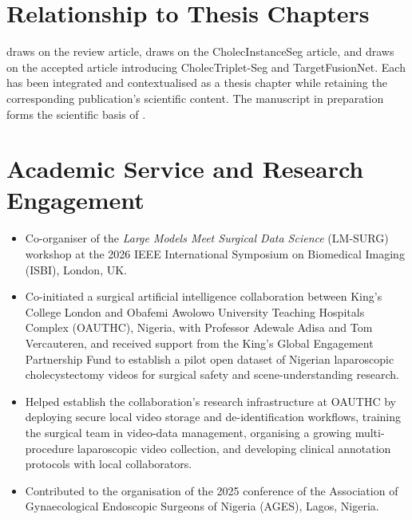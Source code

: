 \section*{Relationship to Thesis Chapters}

 draws on the review article,  draws on the CholecInstanceSeg article, and  draws on the accepted article introducing CholecTriplet-Seg and TargetFusionNet. Each has been integrated and contextualised as a thesis chapter while retaining the corresponding publication's scientific content. The manuscript in preparation forms the scientific basis of .

\section*{Academic Service and Research Engagement}

\begin{itemize}
  \item Co-organiser of the \emph{Large Models Meet Surgical Data Science} (LM-SURG) workshop at the 2026 IEEE International Symposium on Biomedical Imaging (ISBI), London, UK.

  \item Co-initiated a surgical artificial intelligence collaboration between King's College London and Obafemi Awolowo University Teaching Hospitals Complex (OAUTHC), Nigeria, with Professor Adewale Adisa and Tom Vercauteren, and received support from the King's Global Engagement Partnership Fund to establish a pilot open dataset of Nigerian laparoscopic cholecystectomy videos for surgical safety and scene-understanding research.

  \item Helped establish the collaboration's research infrastructure at OAUTHC by deploying secure local video storage and de-identification workflows, training the surgical team in video-data management, organising a growing multi-procedure laparoscopic video collection, and developing clinical annotation protocols with local collaborators.

  \item Contributed to the organisation of the 2025 conference of the Association of Gynaecological Endoscopic Surgeons of Nigeria (AGES), Lagos, Nigeria.
\end{itemize}
